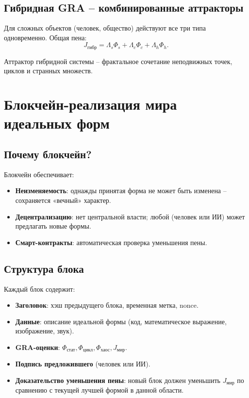 \documentclass[12pt,a4paper]{article}
\begin{document}
\subsection{Гибридная GRA – комбинированные аттракторы}

Для сложных объектов (человек, общество) действуют все три типа одновременно. Общая пена:
\[
J_{\text{гибр}} = \Lambda_s \Phi_s + \Lambda_c \Phi_c + \Lambda_h \Phi_h.
\]

Аттрактор гибридной системы – фрактальное сочетание неподвижных точек, циклов и странных множеств.

\section{Блокчейн-реализация мира идеальных форм}

\subsection{Почему блокчейн?}
Блокчейн обеспечивает:
\begin{itemize}
    \item \textbf{Неизменяемость}: однажды принятая форма не может быть изменена – сохраняется «вечный» характер.
    \item \textbf{Децентрализацию}: нет центральной власти; любой (человек или ИИ) может предлагать новые формы.
    \item \textbf{Смарт-контракты}: автоматическая проверка уменьшения пены.
\end{itemize}

\subsection{Структура блока}
Каждый блок содержит:
\begin{itemize}
    \item \textbf{Заголовок}: хэш предыдущего блока, временная метка, nonce.
    \item \textbf{Данные}: описание идеальной формы (код, математическое выражение, изображение, звук).
    \item \textbf{GRA-оценки}: \(\Phi_{\text{стат}}, \Phi_{\text{цикл}}, \Phi_{\text{хаос}}, J_{\text{мир}}\).
    \item \textbf{Подпись предложившего} (человек или ИИ).
    \item \textbf{Доказательство уменьшения пены}: новый блок должен уменьшить \(J_{\text{мир}}\) по сравнению с текущей лучшей формой в данной области.
\end{itemize}
\end{document}
